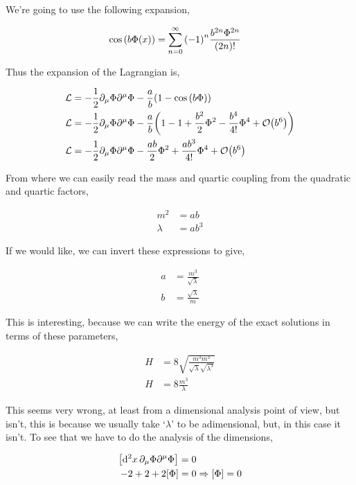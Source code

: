 We're going to use the following expansion,

\begin{align}
    \cos\qty(b\Phi\qty(x))&=\sum\limits_{n=0}^\infty\qty(-1)^{n}\frac{b^{2n}\Phi^{2n}}{\qty(2n)!}\nonumber
\end{align}

Thus the expansion of the Lagrangian is,

\begin{align}
    \mathcal L&=-\frac12\partial_\mu\Phi\partial^\mu\Phi-\frac ab\qty(1-\cos\qty(b\Phi))\nonumber\\
    \mathcal L&=-\frac12\partial_\mu\Phi\partial^\mu\Phi-\frac ab\qty(1-1+\frac{b^2}{2}\Phi^2-\frac{b^4}{4!}\Phi^4+\mathcal O\qty(b^6))\nonumber\\
    \mathcal L&=-\frac12\partial_\mu\Phi\partial^\mu\Phi-\frac{ab}{2}\Phi^2+\frac{ab^3}{4!}\Phi^4+\mathcal O\qty(b^6)\nonumber
\end{align}

From where we can easily read the mass and quartic coupling from the quadratic and quartic factors,

\begin{align}
    m^2&=ab\nonumber\\
    \lambda&=ab^3\nonumber
\end{align}

If we would like, we can invert these expressions to give,

\begin{align}
    a&=\frac{m^3}{\sqrt\lambda}\nonumber\\
    b&=\frac{\sqrt\lambda}{m}\nonumber
\end{align}

This is interesting, because we can write the energy of the exact solutions in terms of these parameters,

\begin{align}
    H&=8\sqrt{\frac{m^3m^3}{\sqrt\lambda \sqrt{\lambda^3}}}\nonumber\\
    H&=8\frac{m^3}{\lambda}\nonumber
\end{align}

This seems very wrong, at least from a dimensional analysis point of view, but isn't, 
this is because we usually take `$\lambda$' to be adimensional, but, in this case it isn't. To 
see that we have to do the analysis of the dimensions,

\begin{align}
    \qty[\dd[2]{x}\partial_\mu\Phi\partial^\mu\Phi]&=0\nonumber\\
    -2+2+2\qty[\Phi]&=0\Rightarrow \qty[\Phi]=0\nonumber
\end{align}

